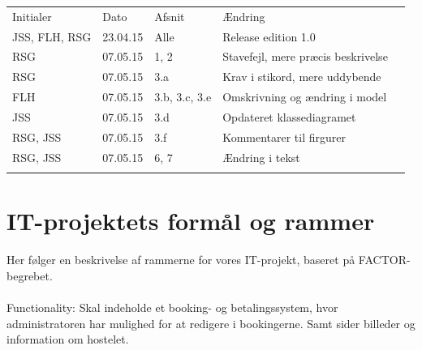 \documentclass[12pt,a4paper]{article}
\begin{document}
\begin{table}[h]
\begin{tabular}{lllll}
\cline{1-4}
\multicolumn{1}{|l|}{Initialer} & \multicolumn{1}{l|}{Dato} & \multicolumn{1}{l|}{Afsnit} & \multicolumn{1}{l|}{Ændring} &  \\ \cline{1-4}
\multicolumn{1}{|l|}{JSS, FLH, RSG}     & \multicolumn{1}{l|}{23.04.15}     & \multicolumn{1}{l|}{Alle}       & \multicolumn{1}{l|}{Release edition 1.0}        &  \\ \cline{1-4}
\multicolumn{1}{|l|}{RSG}     & \multicolumn{1}{l|}{07.05.15}     & \multicolumn{1}{l|}{1, 2}       & \multicolumn{1}{l|}{Stavefejl, mere præcis beskrivelse}        &  \\ \cline{1-4}
\multicolumn{1}{|l|}{RSG}     & \multicolumn{1}{l|}{07.05.15}     & \multicolumn{1}{l|}{3.a}       & \multicolumn{1}{l|}{Krav i stikord, mere uddybende}        &  \\ \cline{1-4}
\multicolumn{1}{|l|}{FLH}     & \multicolumn{1}{l|}{07.05.15}     & \multicolumn{1}{l|}{3.b, 3.c, 3.e}       & \multicolumn{1}{l|}{Omskrivning og ændring i model}        &  \\ \cline{1-4}
\multicolumn{1}{|l|}{JSS}     & \multicolumn{1}{l|}{07.05.15}     & \multicolumn{1}{l|}{3.d}       & \multicolumn{1}{l|}{Opdateret klassediagramet}        &  \\ \cline{1-4}
\multicolumn{1}{|l|}{RSG, JSS}     & \multicolumn{1}{l|}{07.05.15}     & \multicolumn{1}{l|}{3.f}       & \multicolumn{1}{l|}{Kommentarer til firgurer}        &  \\ \cline{1-4}
\multicolumn{1}{|l|}{RSG, JSS}     & \multicolumn{1}{l|}{07.05.15}     & \multicolumn{1}{l|}{6, 7}       & \multicolumn{1}{l|}{Ændring i tekst}        &  \\ \cline{1-4}
                           &                           &                             &                              & 
\end{tabular}
\end{table}


\newpage
\section{IT-projektets formål og rammer}
Her følger en beskrivelse af rammerne for vores IT-projekt, baseret på FACTOR-begrebet.
\\\\
Functionality: Skal indeholde et booking- og betalingssystem, hvor administratoren har mulighed for at redigere i bookingerne. Samt sider billeder og information om hostelet. \\
\end{document}
